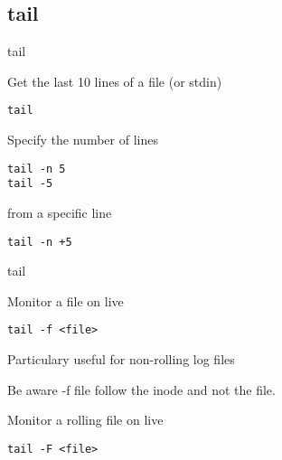\subsection{tail}

\begin{frame}[fragile]{tail}
  \begin{exampleblock}{Get the last 10 lines of a file (or stdin)}
    \begin{lstlisting}[showstringspaces=false]
tail
    \end{lstlisting}
  \end{exampleblock}

  \pause
  \begin{exampleblock}{Specify the number of lines}
    \begin{lstlisting}[showstringspaces=false]
tail -n 5
tail -5
    \end{lstlisting}
  \end{exampleblock}

  \pause
  \begin{exampleblock}{from a specific line}
    \begin{lstlisting}[showstringspaces=false]
tail -n +5
    \end{lstlisting}
  \end{exampleblock}
\end{frame}


\begin{frame}[fragile]{tail}
  \begin{exampleblock}{Monitor a file on live}
    \begin{lstlisting}[showstringspaces=false]
tail -f <file>
    \end{lstlisting}
  \end{exampleblock}
Particulary useful for non-rolling log files
\pause

Be aware -f file follow the inode and not the file.

  \pause
  \begin{exampleblock}{Monitor a rolling file on live}
    \begin{lstlisting}[showstringspaces=false]
tail -F <file>
    \end{lstlisting}
  \end{exampleblock}


\end{frame}

